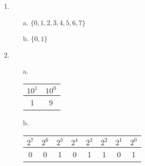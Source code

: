 
\newcommand{\laClass}       {CS 210}
\newcommand{\laSemester}    {Spring 2018}
\newcommand{\laChapter}     {2.6}
\newcommand{\laType}        {Exercise}
\newcommand{\laPoints}      {5}
\newcommand{\laTitle}       {Representations of Numbers}
\newcommand{\laDate}        {}
\setcounter{chapter}{2}
\setcounter{section}{6}
\addtocounter{section}{-1}

\toggletrue{answerkey}





\begin{enumerate}
    \item
        \begin{itemize}
            \item[a.]   $\{0, 1, 2, 3, 4, 5, 6, 7\}$
            \item[b.]   $\{0, 1\}$
        \end{itemize}

    \item
        \begin{itemize}
            \item[a.]
            
                    \begin{tabular}{ | c | c | }
                        \hline
                        $10^{1}$ & $10^{0}$
                        \\ \hline
                        {1}{} &
                        {9}{}
                        \\ \hline
                    \end{tabular}
                
            \item[b.]   
                    \begin{tabular}{ | c | c | c | c | c | c | c | c | }
                        \hline
                        $2^{7}$ &
                        $2^{6}$ &
                        $2^{5}$ &
                        $2^{4}$ &
                        $2^{3}$ &
                        $2^{2}$ &
                        $2^{1}$ &
                        $2^{0}$
                        \\ \hline
                        {0}{} &
                        {0}{} &
                        {1}{} &
                        {0}{} &
                        {1}{} &
                        {1}{} &
                        {0}{} &
                        {1}{}
                        \\ \hline
                    \end{tabular}


\end{itemize}
\end{enumerate}
